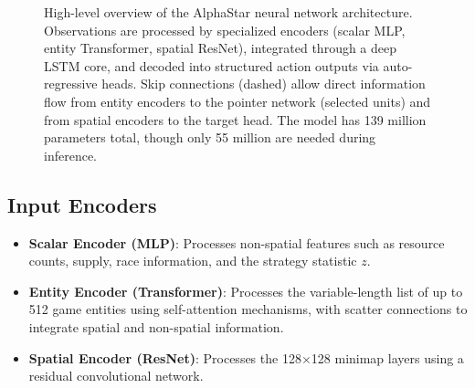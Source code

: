 \documentclass[11pt,a4paper]{article}
\begin{document}
\begin{figure}[H]
\caption{High-level overview of the AlphaStar neural network architecture. Observations are processed by specialized encoders (scalar MLP, entity Transformer, spatial ResNet), integrated through a deep LSTM core, and decoded into structured action outputs via auto-regressive heads. Skip connections (dashed) allow direct information flow from entity encoders to the pointer network (selected units) and from spatial encoders to the target head. The model has 139 million parameters total, though only 55 million are needed during inference.}
\label{fig:architecture}
\end{figure}

\subsection{Input Encoders}

\begin{itemize}[nosep]
    \item \textbf{Scalar Encoder (MLP)}: Processes non-spatial features such as resource counts, supply, race information, and the strategy statistic $z$.
    \item \textbf{Entity Encoder (Transformer)}: Processes the variable-length list of up to 512 game entities using self-attention mechanisms, with scatter connections to integrate spatial and non-spatial information.
    \item \textbf{Spatial Encoder (ResNet)}: Processes the 128$\times$128 minimap layers using a residual convolutional network.
\end{itemize}
\end{document}
